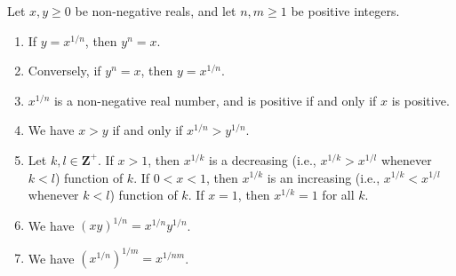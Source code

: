 \begin{lemma}\label{5.6.6}
    Let \(x, y \geq 0\) be non-negative reals, and let \(n, m \geq 1\) be positive integers.
    \begin{enumerate}
        \item If \(y = x^{1 / n}\), then \(y^n = x\).
        \item Conversely, if \(y^n = x\), then \(y = x^{1 / n}\).
        \item \(x^{1 / n}\) is a non-negative real number, and is positive if and only if \(x\) is positive.
        \item We have \(x > y\) if and only if \(x^{1 / n} > y^{1 / n}\).
        \item Let \(k, l \in \mathbf{Z}^+\).
              If \(x > 1\), then \(x^{1 / k}\) is a decreasing (i.e., \(x^{1 / k} > x^{1 / l}\) whenever \(k < l\)) function of \(k\).
              If \(0 < x < 1\), then \(x^{1 / k}\) is an increasing (i.e., \(x^{1 / k} < x^{1 / l}\) whenever \(k < l\)) function of \(k\).
              If \(x = 1\), then \(x^{1 / k} = 1\) for all \(k\).
        \item We have \((xy)^{1 / n} = x^{1 / n} y^{1 / n}\).
        \item We have \((x^{1 / n})^{1 / m} = x^{1 / nm}\).
    \end{enumerate}
\end{lemma}

